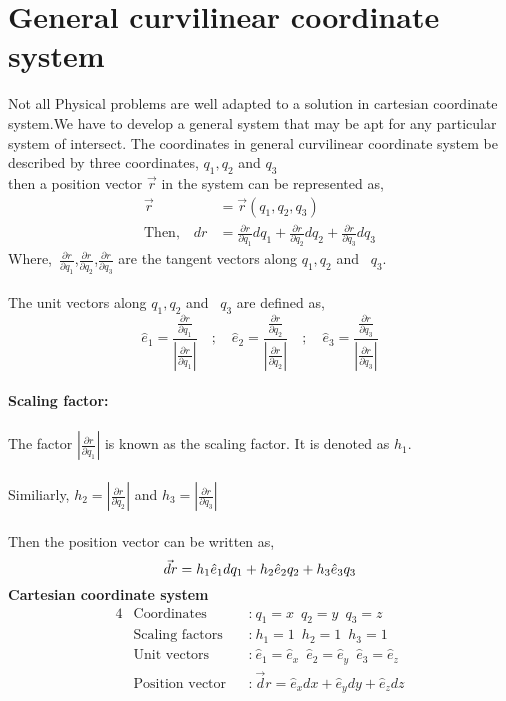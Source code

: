 \section{General curvilinear coordinate system}
Not all Physical problems  are well adapted to a solution in cartesian coordinate system.We have to develop a general system that may be apt for any particular system of intersect.
The coordinates in general curvilinear coordinate system be described by three coordinates, $q_{1},q_{2} $ and $ q_{3}$\\then  a position vector $ \vec{ r}$ in the system can be represented as,
\begin{align*}
\vec{r}&=\vec{r}(q_{1},q_{2},q_{3})\\
\text{Then,}\quad
 dr&={\frac{\partial r}{\partial q_{1} }} dq_{1}+{\frac{\partial r}{\partial q_{2} }} dq_{2}+{\frac{\partial r}{\partial q_{3} }} dq_{3}
\end{align*}
Where,\ ${\frac{\partial r}{\partial q_{1} }}$,${\frac{\partial r}{\partial q_{2} }}$,${\frac{\partial r}{\partial q_{3} }}$ are the tangent vectors along $q_{1},q_{2}  $ and \ $q_{3}$.
\\\\The unit vectors along $q_{1},q_{2}  $ and \ $q_{3}$ are defined as,
$$ \hat e_{1}=\frac{{\frac{\partial r}{\partial q_{1} }}}{|{\frac{\partial r}{\partial q_{1} }}|}\quad ;\quad
 \hat e_{2}=\frac{{\frac{\partial r}{\partial q_{2} }}}{|{\frac{\partial r}{\partial q_{2} }}|}\quad ;\quad\hat e_{3}=\frac{{\frac{\partial r}{\partial q_{3} }}}{|{\frac{\partial r}{\partial q_{3} }}|}$$
\\
\textbf{Scaling factor:}\\\\
The factor ${|{\frac{\partial r}{\partial q_{1} }}|}$ is known as the scaling factor. It is denoted as $h_{1}$.\\\\
Similiarly, $h_{2}={|{\frac{\partial r}{\partial q_{2} }}|}$
and $h_{3}={|{\frac{\partial r}{\partial q_{3} }}|}$\\
\\Then the position vector can be written as,
\begin{equation}
$$ \vec dr=h_{1}\hat e_{1} dq_{1}+h_{2}\hat e_{2} q_{2}+h_{3}\hat e_{3}q_{3}$$
\end{equation}
\textbf{Cartesian coordinate system}
\begin{alignat*}{4}
&\text{Coordinates}&& \textbf{:} \ q_{1}=x\;\ q_{2}=y\;\ q_{3}=z\\
&\text{Scaling factors} && \textbf{:}\ h_{1}=1\; \ h_{2}=1\;\  h_{3}=1\\
&\text{Unit vectors}&&\textbf{:}\ \hat{e}_{1}=\hat{e}_{x}\;\ \hat{e}_{2}=\hat{e}_{y}\;\ \hat{e}_{3}=\hat{e}_{z}\\
&\text{Position vector}&&\textbf{:} \ \vec dr=\hat e_{x} dx+\hat e_{y} dy+\hat e_{z}dz
\end{alignat*}

